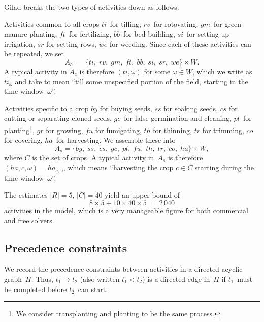 \documentclass[11pt,reqno]{amsart}
\newcommand{\lra}{\longrightarrow}
\numberwithin{equation}{section}
\begin{document}
\smallskip
Gilad breaks the two types of activities down as follows:

\begin{mydesc}
\item[Activities common to all crops] $ti$~for tilling, $rv$~for rotovating, $gm$~for
  green manure planting, $f\!t$~for fertilizing, $bb$~for bed building, $si$~for setting
  up irrigation, $sr$ for setting rows, $we$ for weeding. Since each of these activities
  can be repeated, we set
  \[
     A_c 
     \ = \
     \{ ti,\;rv,\;gm,\;f\!t,\;bb,\;si,\;sr,\;we\} \times W.
  \]
  A typical activity in $A_c$ is therefore $(ti,\omega)$ for some $\omega\in W$, which we
  write as $ti_{\omega}$ and take to mean ``till some unspecified portion of the field,
  starting in the time window~$\omega$''.


\item[Activities specific to a crop] $by$ for buying seeds, $ss$ for soaking seeds, $cs$
  for cutting or separating cloned seeds, $gc$~for false germination and cleaning,
  $pl$~for planting\footnote{We consider transplanting and planting to be the same
    process.}, $gr$ for growing, $f\!u$ for fumigating, $th$ for thinning, $tr$ for
  trimming, $co$ for covering, $ha$~for harvesting. We assemble these into
  \[
     A_s = \{ by,\;ss,\;cs,\;gc,\;pl,\;f\!u,\;th,\;tr,\;co,\;ha\} \times W,
  \]
  where $C$ is the set of crops. A typical activity in~$A_s$ is therefore $(ha,c,
  \omega)=ha_{c, \omega}$, which means ``harvesting the crop $c\in C$ starting during the
  time window~$\omega$''.
\end{mydesc}

The estimates $|R|=5$, $|C|=40$ yield an upper bound of
\[
    8  \times 5 + 10 \times 40  \times 5
    \ = \
    2\,040
\]
activities in the model, which is a very manageable figure for both commercial and free
solvers.


\subsection{Precedence constraints}

We record the precedence constraints between  activities in a directed acyclic
graph~$H$. Thus, $t_1\lra t_2$ (also written $t_1<t_2$) is a directed edge
in~$H$ if $t_1$~must be completed before $t_2$~can start. 
\end{document}
